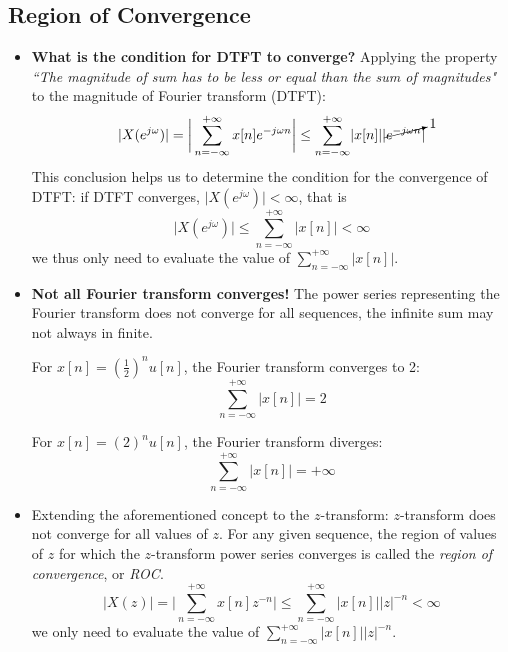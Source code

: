 \subsection{Region of Convergence}

\begin{itemize}
    \item \textbf{What is the condition for DTFT to converge?} Applying the property \textit{``The magnitude of sum has to be less or equal than the sum of magnitudes"} to the magnitude of Fourier transform (DTFT):
    \begin{align*}
        \lvert X(e^{j \omega}) \rvert
        & = \bigg\lvert \sum_{n=-\infty}^{+\infty} x[n] e^{-j\omega n} \bigg\rvert \leq  \sum_{n=-\infty}^{+\infty} \lvert x[n] \rvert \lvert \cancelto{1}{e^{-j\omega n}} \rvert \\
    \end{align*}
    This conclusion helps us to determine the condition for the convergence of DTFT: if DTFT converges, $\lvert X(e^{j \omega}) \rvert < \infty$, that is
    \[
        \lvert X(e^{j \omega}) \rvert \leq \sum_{n=-\infty}^{+\infty}\lvert x[n] \rvert < \infty
    \]
    we thus only need to evaluate the value of $\sum_{n=-\infty}^{+\infty}\lvert x[n] \rvert$.

    \item \textbf{Not all Fourier transform converges!} The power series representing the Fourier transform does not converge for all sequences, the infinite sum may not always in finite.
    
    \begin{minipage}{.45\textwidth}
    \begin{ex}{}
    For $x[n] = (\frac{1}{2})^n u[n]$, the Fourier transform converges to 2:
    \[
    \sum_{n=-\infty}^{+\infty} \lvert x[n] \rvert = 2
    \]
    \end{ex}
    \end{minipage} \hfill
    \begin{minipage}{.45\textwidth}
    \begin{ex}{}
    For $x[n] = (2)^n u[n]$, the Fourier transform diverges:
    \[
    \sum_{n=-\infty}^{+\infty} \lvert x[n] \rvert = +\infty
    \]
    \end{ex}
    \end{minipage}

    \item Extending the aforementioned concept to the $z$-transform: $z$-transform does not converge for all values of $z$. For any given sequence, the region of values of $z$ for which the $z$-transform power series converges is called the \textit{region of convergence}, or \textit{ROC}.
    \[
        \lvert X(z) \rvert = \bigg\lvert  \sum_{n=-\infty}^{+\infty} x[n] z^{-n} \bigg\rvert \leq \sum_{n=-\infty}^{+\infty} \lvert x[n] \rvert \lvert z \rvert^{-n} < \infty
    \]
    we only need to evaluate the value of $\sum_{n=-\infty}^{+\infty} \lvert x[n] \rvert \lvert z \rvert^{-n}$.


\end{itemize}
